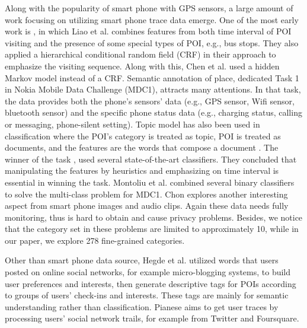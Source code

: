 Along with the popularity of smart phone with GPS sensors, a large amount of work \cite{Liao:2007:EPA:1229555.1229562,placer11,MDCconditional,phoneImageAudio,topicmodelMDC1,MDCdescriptive} 
focusing on utilizing smart phone trace data emerge. 
One of the most early work is \cite{Liao:2007:EPA:1229555.1229562}, 
in which Liao et al. combines features from both time interval 
of POI visiting and the presence of some special types of POI, e.g., bus stops. 
They also applied a hierarchical conditional random field (CRF) in their approach 
to emphasize the visiting sequence. Along with this, Chen et al.\cite{placer11} 
used a hidden Markov model instead of a CRF. Semantic annotation of place, 
dedicated Task 1 in Nokia Mobile Data Challenge (MDC1)\cite{eberle2012mobile}, 
attracts many attentions\cite{MDCconditional,topicmodelMDC1,MDCdescriptive}. 
In that task, the data provides both the phone's sensors' data 
(e.g., GPS sensor, Wifi sensor, bluetooth sensor) and the specific 
phone status data (e.g., charging status, calling or messaging, 
phone-silent setting). Topic model has also been used 
in classification where the POI's category is treated as topic, 
POI is treated as documents, and the features are the words that 
compose a document \cite{topicmodelMDC1}. 
The winner of the task \cite{MDCconditional}, used several state-of-the-art 
classifiers. They concluded that manipulating the features by heuristics 
and emphasizing on time interval is essential in winning the task. 
Montoliu et al.\cite{MDCdescriptive} combined several binary classifiers 
to solve the multi-class problem for MDC1.
Chon\cite{phoneImageAudio} explores another interesting aspect from smart phone 
images and audio clips.
Again these data needs fully monitoring, thus is hard to obtain and 
cause privacy problems. Besides, we notice that the category set in these problems 
are limited to approximately 10, while in our paper, we explore 278 fine-grained 
categories.

Other than smart phone data source, Hegde et al.\cite{interestprofile} utilized words that 
users posted on online social networks, for example micro-blogging systems, 
to build user preferences and interests, then generate descriptive tags for POIs 
according to groups of users' check-ins and interests. 
These tags are mainly for semantic understanding rather than classification. 
Pianese\cite{UserRoutine} aims to get user traces by processing users' 
social network trails, for example from Twitter and Foursquare.

